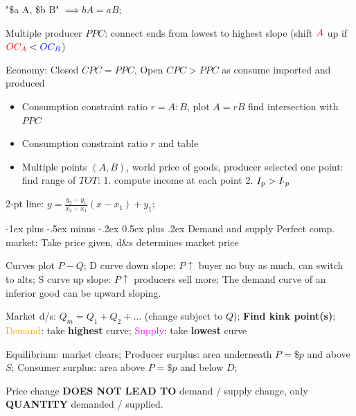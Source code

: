 \documentclass[a4paper]{article}
\makeatletter
\renewcommand{\section}{\@startsection{section}{1}{0mm}%
                                {-1ex plus -.5ex minus -.2ex}%
                                {0.5ex plus .2ex}%
                                {\normalfont\small\bfseries}}
\makeatother
\begin{document}
\begin{multicols*}{3}
    "\$a A, \$b B" $\implies bA=aB$;

    Multiple producer $PPC$: connect ends from lowest to highest slope (shift $\textcolor{red}{A}$ up if $\textcolor{red}{OC_A}<\textcolor{blue}{OC_B}$)

    Economy: Closed $CPC=PPC$, Open $CPC > PPC$ as consume imported and produced

    \begin{itemize}
        \item Consumption constraint ratio $r=A:B$, plot $A=rB$ find intersection with $PPC$
        \item Consumption constraint ratio $r$ and table
        \item Multiple points $(A,B)$, world price of goods, producer selected one point: find range of $TOT$: 1. compute income at each point 2. $I_p > I_{`p}$
    \end{itemize}

    2-pt line: $y=\frac{y_2-y_1}{x_2-x_1}(x-x_1)+y_1$;

    \section{Demand and supply}
    Perfect comp. market: Take price given, d\&s determines market price

    Curves plot $P-Q$; D curve down slope: $P\uparrow$ buyer no buy as much, can switch to alts; S curve up slope: $P\uparrow$ producers sell more; The demand curve of an inferior good can be upward sloping.

    Market d/s: $Q_m = Q_1 + Q_2 + \ldots$ (change subject to $Q$); \textbf{Find kink point(s)}; \textcolor{orange}{Demand}: take \textbf{highest} curve; \textcolor{magenta}{Supply}: take \textbf{lowest} curve

    Equilibrium: market clears; Producer surplus: area underneath $P=\$p$ and above $S$; Consumer surplus: area above $P=\$p$ and below $D$;

        Price change \textbf{DOES NOT LEAD TO} demand / supply change, only \textbf{QUANTITY} demanded / supplied.


\end{multicols*}
\end{document}
